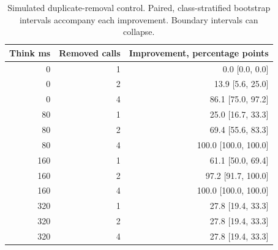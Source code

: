 \begin{table}[htbp]
\centering\small
\caption{Simulated duplicate-removal control. Paired, class-stratified bootstrap intervals accompany each improvement. Boundary intervals can collapse.}\label{tab:contrasts}
\begin{tabular}{rrr}\toprule
Think ms & Removed calls & Improvement, percentage points \\\midrule
0 & 1 & 0.0 [0.0, 0.0] \\
0 & 2 & 13.9 [5.6, 25.0] \\
0 & 4 & 86.1 [75.0, 97.2] \\
80 & 1 & 25.0 [16.7, 33.3] \\
80 & 2 & 69.4 [55.6, 83.3] \\
80 & 4 & 100.0 [100.0, 100.0] \\
160 & 1 & 61.1 [50.0, 69.4] \\
160 & 2 & 97.2 [91.7, 100.0] \\
160 & 4 & 100.0 [100.0, 100.0] \\
320 & 1 & 27.8 [19.4, 33.3] \\
320 & 2 & 27.8 [19.4, 33.3] \\
320 & 4 & 27.8 [19.4, 33.3] \\\bottomrule
\end{tabular}
\end{table}
